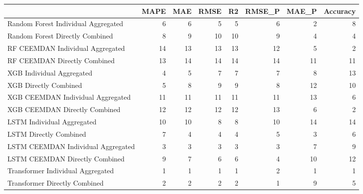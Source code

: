 \begin{tabular}{lrrrrrrr}
\toprule
{} &  MAPE &  MAE &  RMSE &  R2 &  RMSE\_P &  MAE\_P &  Accuracy \\
\midrule
Random Forest Individual Aggregated &     6 &    6 &     5 &   5 &       6 &      2 &         8 \\
Random Forest Directly Combined     &     8 &    9 &    10 &  10 &       9 &      4 &         4 \\
RF CEEMDAN Individual Aggregated    &    14 &   13 &    13 &  13 &      12 &      5 &         2 \\
RF CEEMDAN Directly Combined        &    13 &   14 &    14 &  14 &      14 &     11 &        11 \\
XGB Individual Aggregated           &     4 &    5 &     7 &   7 &       7 &      8 &        13 \\
XGB Directly Combined               &     5 &    8 &     9 &   9 &       8 &     12 &        10 \\
XGB CEEMDAN Individual Aggregated   &    11 &   11 &    11 &  11 &      11 &     13 &         6 \\
XGB CEEMDAN Directly Combined       &    12 &   12 &    12 &  12 &      13 &      6 &         2 \\
LSTM Individual Aggregated          &    10 &   10 &     8 &   8 &      10 &     14 &        14 \\
LSTM Directly Combined              &     7 &    4 &     4 &   4 &       5 &      3 &         6 \\
LSTM CEEMDAN Individual Aggregated  &     3 &    3 &     3 &   3 &       3 &      7 &         9 \\
LSTM CEEMDAN Directly Combined      &     9 &    7 &     6 &   6 &       4 &     10 &        12 \\
Transformer Individual Aggregated   &     1 &    1 &     1 &   1 &       2 &      1 &         1 \\
Transformer Directly Combined       &     2 &    2 &     2 &   2 &       1 &      9 &         5 \\
\bottomrule
\end{tabular}
